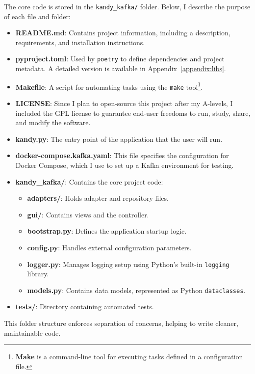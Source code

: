 \documentclass[10pt , a4paper]{report}
\begin{document}
The core code is stored in the \texttt{kandy\_kafka/} folder. Below, I describe the purpose of each file and folder:

\begin{itemize}
  \item \textbf{README.md}: Contains project information, including a description, requirements, and installation instructions.
  \item \textbf{pyproject.toml}: Used by \texttt{poetry} to define dependencies and project metadata. A detailed version is available in Appendix~\ref{appendix:libs}.
  \item \textbf{Makefile}: A script for automating tasks using the \texttt{make} tool\footnote{\textbf{Make} is a command-line tool for executing tasks defined in a configuration file.}.
  \item \textbf{LICENSE}: Since I plan to open-source this project after my A-levels, I included the GPL license to guarantee end-user freedoms to run, study, share, and modify the software.
  \item \textbf{kandy.py}: The entry point of the application that the user will run.
  \item \textbf{docker-compose.kafka.yaml}: This file specifies the configuration for Docker Compose, which I use to set up a Kafka environment for testing.
  \item \textbf{kandy\_kafka/}: Contains the core project code:
    \begin{itemize}
      \item \textbf{adapters/}: Holds adapter and repository files.
      \item \textbf{gui/}: Contains views and the controller.
      \item \textbf{bootstrap.py}: Defines the application startup logic.
      \item \textbf{config.py}: Handles external configuration parameters.
      \item \textbf{logger.py}: Manages logging setup using Python's built-in \texttt{logging} library.
      \item \textbf{models.py}: Contains data models, represented as Python \texttt{dataclasses}.
    \end{itemize}
  \item \textbf{tests/}: Directory containing automated tests.
\end{itemize}

This folder structure enforces separation of concerns, helping to write cleaner, maintainable code.
\end{document}
